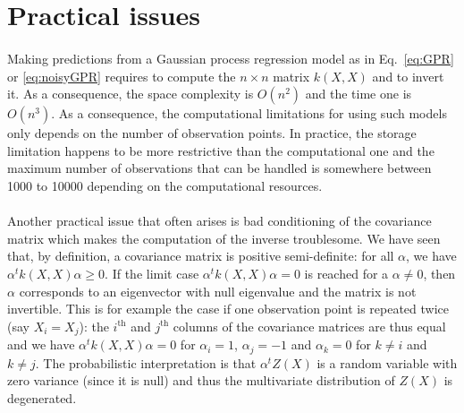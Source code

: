 \documentclass[twoside,openright]{report}
\begin{document}
\section{Practical issues}
\paragraph{}
Making predictions from a Gaussian process regression model as in Eq.~\ref{eq:GPR} or \ref{eq:noisyGPR} requires to compute the $n \times n$ matrix $k(X,X)$ and to invert it. As a consequence, the space complexity is $O(n^2)$ and the time one is $O(n^3)$. As a consequence, the computational limitations for using such models only depends on the number of observation points. In practice, the storage limitation happens to be more restrictive than the computational one and the maximum number of observations that can be handled is somewhere between 1000 to 10000 depending on the computational resources.

\paragraph{}
Another practical issue that often arises is bad conditioning of the covariance matrix which makes the computation of the inverse troublesome. We have seen that, by definition, a covariance matrix is positive semi-definite: for all $\alpha$, we have $\alpha^t k(X,X) \alpha \geq 0$. If the limit case $\alpha^t k(X,X) \alpha = 0$ is reached for a $\alpha \neq 0$, then $\alpha$ corresponds to an eigenvector with null eigenvalue and the matrix is not invertible. This is for example the case if one observation point is repeated twice (say $X_i = X_j$): the $i^{\mathrm{th}}$ and $j^{\mathrm{th}}$ columns of the covariance matrices are thus equal and we have $\alpha^t k(X,X) \alpha = 0$ for $\alpha_i=1$, $\alpha_j=-1$ and $\alpha_k=0$ for $k \neq i$ and $k \neq j$. The probabilistic interpretation is that $\alpha^t Z(X)$ is a random variable with zero variance (since it is null) and thus the multivariate distribution of $Z(X)$ is degenerated. 
\end{document}
